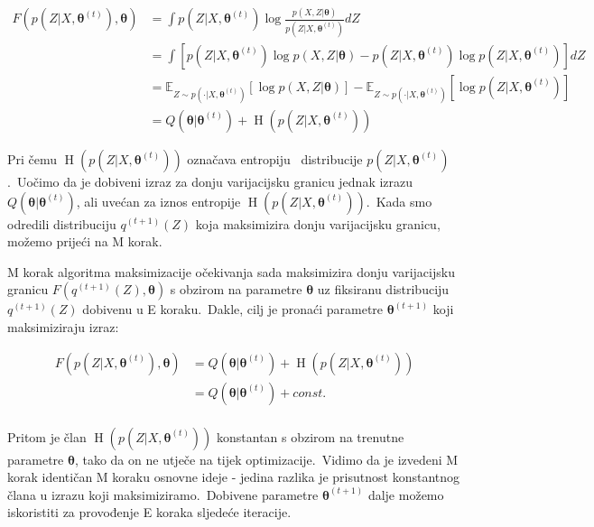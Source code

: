 \documentclass[diplomskirad]{fer}
\begin{document}
\begin{equation}
  \begin{aligned}
    F(p(Z | X, \bm{\theta}^{(t)}), \bm{\theta}) &= \int p(Z | X, \bm{\theta}^{(t)}) \log \frac{p(X, Z | \bm{\theta})}{p(Z | X, \bm{\theta}^{(t)})} dZ \\
                         &= \int \left[ p(Z | X, \bm{\theta}^{(t)}) \log p(X, Z | \bm{\theta}) - p(Z | X, \bm{\theta}^{(t)}) \log p(Z | X, \bm{\theta}^{(t)}) \right] dZ \\
                         &= \mathbb{E}_{Z \sim p(\cdot | X, \bm{\theta}^{(t)})} \left[ \log p(X, Z | \bm{\theta}) \right] - \mathbb{E}_{Z \sim p(\cdot | X, \bm{\theta}^{(t)})} \left[\log p(Z | X, \bm{\theta}^{(t)}) \right] \\
                         &= Q(\bm{\theta} | \bm{\theta}^{(t)}) + \operatorname{H}(p(Z | X, \bm{\theta}^{(t)}))
  \end{aligned}
  \label{eq:em_equality_of_e_step}
\end{equation}

Pri čemu $\operatorname{H}(p(Z | X, \bm{\theta}^{(t)}))$ označava entropiju~\cite{renyi1961measures} distribucije $p(Z | X, \bm{\theta}^{(t)})$.\ Uočimo da je dobiveni izraz za donju varijacijsku granicu jednak izrazu $Q(\bm{\theta} | \bm{\theta}^{(t)})$, ali uvećan za iznos entropije $\operatorname{H}(p(Z | X, \bm{\theta}^{(t)}))$.\ 
Kada smo odredili distribuciju $q^{(t + 1)}(Z)$ koja maksimizira donju varijacijsku granicu, možemo prijeći na M korak.\ 

M korak algoritma maksimizacije očekivanja sada maksimizira donju varijacijsku granicu $F(q^{(t + 1)}(Z), \bm{\theta})$ s obzirom na parametre $\bm{\theta}$ uz fiksiranu distribuciju $q^{(t + 1)}(Z)$ dobivenu u E koraku.\
Dakle, cilj je pronaći parametre $\bm{\theta}^{(t + 1)}$ koji maksimiziraju izraz:

\begin{equation}
  \begin{aligned}
    F(p(Z | X, \bm{\theta}^{(t)}), \bm{\theta}) &= Q(\bm{\theta} | \bm{\theta}^{(t)}) + \operatorname{H}(p(Z | X, \bm{\theta}^{(t)})) \\ 
                                                &= Q(\bm{\theta} | \bm{\theta}^{(t)}) + const. \\
  \end{aligned}
  \label{eq:em_m_step_general}
\end{equation}

Pritom je član $\operatorname{H}(p(Z | X, \bm{\theta}^{(t)}))$ konstantan s obzirom na trenutne parametre $\bm{\theta}$, tako da on ne utječe na tijek optimizacije.\
Vidimo da je izvedeni M korak identičan M koraku osnovne ideje - jedina razlika je prisutnost konstantnog člana u izrazu koji maksimiziramo.\ 
Dobivene parametre $\bm{\theta}^{(t + 1)}$ dalje možemo iskoristiti za provođenje E koraka sljedeće iteracije.\ 
\end{document}
